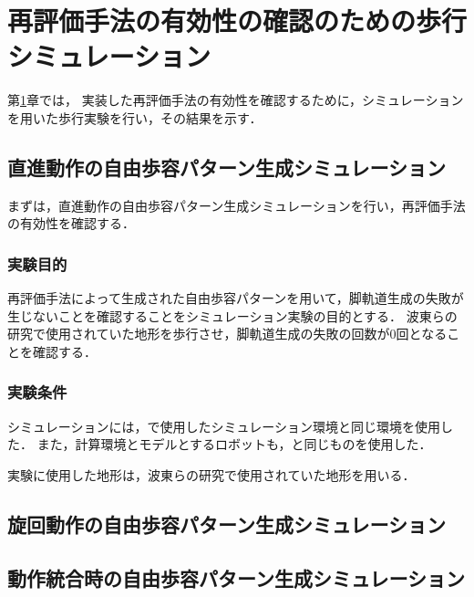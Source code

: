 ﻿

\chapter{再評価手法の有効性の確認のための歩行シミュレーション}\label{chapter:再評価手法の有効性の確認のための歩行シミュレーション}
第\ref{chapter:再評価手法の有効性の確認のための歩行シミュレーション}章では，
実装した再評価手法の有効性を確認するために，シミュレーションを用いた歩行実験を行い，その結果を示す．

\section{直進動作の自由歩容パターン生成シミュレーション}
まずは，直進動作の自由歩容パターン生成シミュレーションを行い，再評価手法の有効性を確認する．

\subsection{実験目的}
再評価手法によって生成された自由歩容パターンを用いて，脚軌道生成の失敗が生じないことを確認することをシミュレーション実験の目的とする．
波東らの研究で使用されていた地形を歩行させ，脚軌道生成の失敗の回数が0回となることを確認する．

\subsection{実験条件}
シミュレーションには，で使用したシミュレーション環境と同じ環境を使用した．
また，計算環境とモデルとするロボットも，と同じものを使用した．

実験に使用した地形は，波東らの研究で使用されていた地形を用いる．

\section{旋回動作の自由歩容パターン生成シミュレーション}

\section{動作統合時の自由歩容パターン生成シミュレーション}